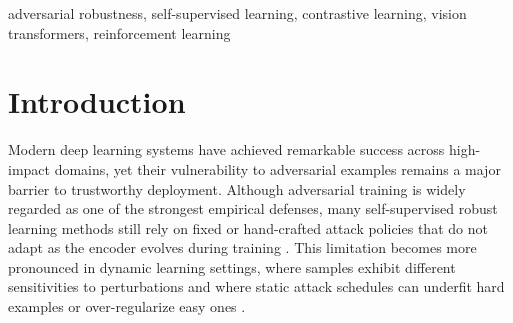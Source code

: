 \documentclass[conference]{IEEEtran}
\begin{document}
\begin{abstract}
Adversarial training is one of the most effective defenses against adversarial attacks, yet most self-supervised robust learning methods rely on fixed or hand-crafted attack strategies that do not adapt as the model evolves during training. In this work, we present ASTrA (Adversarial Self-supervised Training with Adaptive Attacks), a framework that combines contrastive self-supervised learning with a reinforcement learning-based strategy network to dynamically generate per-sample adversarial perturbations. The strategy network, trained via REINFORCE, selects instance-specific attack parameters including perturbation budget, number of attack iterations, and step size, enabling the training procedure to continuously calibrate attack difficulty throughout the learning process. We employ a dual normalization mechanism that maintains separate normalization statistics for clean and adversarial data paths. Furthermore, we extend the framework from its original ResNet-18 backbone to a Vision Transformer (ViT-Small) architecture with dual LayerNorm, investigating how adaptive adversarial training transfers to transformer-based encoders. The framework is evaluated on CIFAR-10 using standard linear finetuning, adversarial linear finetuning, and adversarial full finetuning protocols, with robustness assessed under AutoAttack.
\end{abstract}

\begin{IEEEkeywords}
adversarial robustness, self-supervised learning, contrastive learning, vision transformers, reinforcement learning
\end{IEEEkeywords}

\section{Introduction}

Modern deep learning systems have achieved remarkable success across high-impact domains, yet their vulnerability to adversarial examples remains a major barrier to trustworthy deployment. Although adversarial training is widely regarded as one of the strongest empirical defenses, many self-supervised robust learning methods still rely on fixed or hand-crafted attack policies that do not adapt as the encoder evolves during training \cite{b1,b2,b3,b4,b5}. This limitation becomes more pronounced in dynamic learning settings, where samples exhibit different sensitivities to perturbations and where static attack schedules can underfit hard examples or over-regularize easy ones \cite{b5}.
\end{document}
